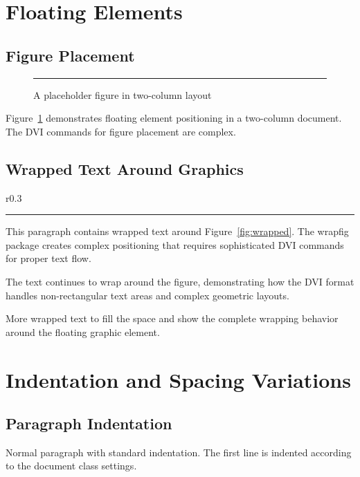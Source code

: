 \documentclass[10pt,twocolumn]{article}
\begin{document}
\section{Floating Elements}

\subsection{Figure Placement}

\begin{figure}[h]
\centering
\rule{5cm}{3cm}
\caption{A placeholder figure in two-column layout}
\label{fig:placeholder}
\end{figure}

Figure~\ref{fig:placeholder} demonstrates floating element positioning in a two-column document. The DVI commands for figure placement are complex.

\lipsum[3]

\subsection{Wrapped Text Around Graphics}

\begin{wrapfigure}{r}{0.3\linewidth}
\centering
\rule{2cm}{2cm}
\caption{Wrapped figure}
\label{fig:wrapped}
\end{wrapfigure}

This paragraph contains wrapped text around Figure~\ref{fig:wrapped}. The wrapfig package creates complex positioning that requires sophisticated DVI commands for proper text flow.

The text continues to wrap around the figure, demonstrating how the DVI format handles non-rectangular text areas and complex geometric layouts.

More wrapped text to fill the space and show the complete wrapping behavior around the floating graphic element.

\lipsum[4]

\section{Indentation and Spacing Variations}

\subsection{Paragraph Indentation}

Normal paragraph with standard indentation. The first line is indented according to the document class settings.
\end{document}
